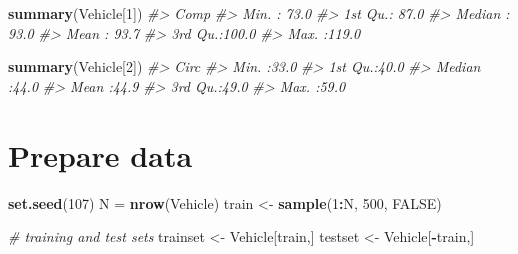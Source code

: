 \documentclass[]{book}
\newenvironment{Shaded}{\begin{snugshade}}{\end{snugshade}}
\newcommand{\CommentTok}[1]{\textcolor[rgb]{0.56,0.35,0.01}{\textit{#1}}}
\newcommand{\DecValTok}[1]{\textcolor[rgb]{0.00,0.00,0.81}{#1}}
\newcommand{\KeywordTok}[1]{\textcolor[rgb]{0.13,0.29,0.53}{\textbf{#1}}}
\newcommand{\NormalTok}[1]{#1}
\newcommand{\OperatorTok}[1]{\textcolor[rgb]{0.81,0.36,0.00}{\textbf{#1}}}
\newcommand{\OtherTok}[1]{\textcolor[rgb]{0.56,0.35,0.01}{#1}}
\newcommand{\StringTok}[1]{\textcolor[rgb]{0.31,0.60,0.02}{#1}}
\begin{document}
\begin{Shaded}
\begin{Highlighting}[]
\KeywordTok{summary}\NormalTok{(Vehicle[}\DecValTok{1}\NormalTok{])}
\CommentTok{#>       Comp      }
\CommentTok{#>  Min.   : 73.0  }
\CommentTok{#>  1st Qu.: 87.0  }
\CommentTok{#>  Median : 93.0  }
\CommentTok{#>  Mean   : 93.7  }
\CommentTok{#>  3rd Qu.:100.0  }
\CommentTok{#>  Max.   :119.0}
\end{Highlighting}
\end{Shaded}

\begin{Shaded}
\begin{Highlighting}[]
\KeywordTok{summary}\NormalTok{(Vehicle[}\DecValTok{2}\NormalTok{])}
\CommentTok{#>       Circ     }
\CommentTok{#>  Min.   :33.0  }
\CommentTok{#>  1st Qu.:40.0  }
\CommentTok{#>  Median :44.0  }
\CommentTok{#>  Mean   :44.9  }
\CommentTok{#>  3rd Qu.:49.0  }
\CommentTok{#>  Max.   :59.0}
\end{Highlighting}
\end{Shaded}

\begin{Shaded}
\end{Shaded}

\hypertarget{prepare-data}{%
\section{Prepare data}\label{prepare-data}}

\begin{Shaded}
\begin{Highlighting}[]
\KeywordTok{set.seed}\NormalTok{(}\DecValTok{107}\NormalTok{)}
\NormalTok{N =}\StringTok{ }\KeywordTok{nrow}\NormalTok{(Vehicle)}
\NormalTok{train <-}\StringTok{ }\KeywordTok{sample}\NormalTok{(}\DecValTok{1}\OperatorTok{:}\NormalTok{N, }\DecValTok{500}\NormalTok{, }\OtherTok{FALSE}\NormalTok{)}
\end{Highlighting}
\end{Shaded}

\begin{Shaded}
\begin{Highlighting}[]
\CommentTok{# training and test sets}
\NormalTok{trainset <-}\StringTok{ }\NormalTok{Vehicle[train,]}
\NormalTok{testset  <-}\StringTok{ }\NormalTok{Vehicle[}\OperatorTok{-}\NormalTok{train,]}
\end{Highlighting}
\end{Shaded}
\end{document}
